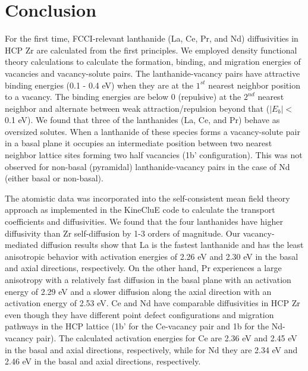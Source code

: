 \documentclass[preprint,12pt]{elsarticle}
\providecommand{\DIFadd}[1]{{\bf #1}} %
\providecommand{\DIFdel}[1]{} %
\providecommand{\DIFaddbegin}{\protect\color{blue}} %
\providecommand{\DIFaddend}{\protect\color{black}} %
\providecommand{\DIFdelbegin}{\protect\color{red}} %
\providecommand{\DIFdelend}{\protect\color{black}} %
\newcommand{\DIFscaledelfig}{0.5}
\newlength{\DIFdelgraphicswidth} %
\newlength{\DIFdelgraphicsheight} %
\newcommand{\DIFaddincludegraphics}[2][]{{\color{blue}\fbox{\DIFOincludegraphics[#1]{#2}}}} %
\newcommand{\DIFdelincludegraphics}[2][]{%
\sbox{\DIFdelgraphicsbox}{\DIFOincludegraphics[#1]{#2}}%
\settoboxwidth{\DIFdelgraphicswidth}{\DIFdelgraphicsbox} %
\settoboxtotalheight{\DIFdelgraphicsheight}{\DIFdelgraphicsbox} %
\scalebox{\DIFscaledelfig}{%
\parbox[b]{\DIFdelgraphicswidth}{\usebox{\DIFdelgraphicsbox}\\[-\baselineskip] \rule{\DIFdelgraphicswidth}{0em}}\llap{\resizebox{\DIFdelgraphicswidth}{\DIFdelgraphicsheight}{%
\setlength{\unitlength}{\DIFdelgraphicswidth}%
\begin{picture}(1,1)%
\thicklines\linethickness{2pt} %
{\color[rgb]{1,0,0}\put(0,0){\framebox(1,1){}}}%
{\color[rgb]{1,0,0}\put(0,0){\line( 1,1){1}}}%
{\color[rgb]{1,0,0}\put(0,1){\line(1,-1){1}}}%
\end{picture}%
}\hspace*{3pt}}} %
} %
\DeclareRobustCommand{\DIFaddbegin}{\DIFOaddbegin \let\includegraphics\DIFaddincludegraphics} %
\DeclareRobustCommand{\DIFaddend}{\DIFOaddend \let\includegraphics\DIFOincludegraphics} %
\DeclareRobustCommand{\DIFdelbegin}{\DIFOdelbegin \let\includegraphics\DIFdelincludegraphics} %
\DeclareRobustCommand{\DIFdelend}{\DIFOaddend \let\includegraphics\DIFOincludegraphics} %
\begin{document}
\section{Conclusion}
For the first time, FCCI-relevant lanthanide (La, Ce, Pr, and Nd) diffusivities in HCP Zr are calculated from the first principles. We employed density functional theory calculations to calculate the formation, binding, and migration energies of vacancies and vacancy-solute pairs. The lanthanide-vacancy pairs have attractive binding energies (0.1 - 0.4 eV) when they are at the $1^{st}$ nearest neighbor position to a vacancy. The binding energies are below 0 (repulsive) at the $2^{nd}$ nearest neighbor and alternate between weak attraction/repulsion beyond that ($|E_b| < $ 0.1 eV). We found that three of the lanthanides (La, Ce, and Pr) behave as oversized solutes. When a lanthanide of these species forms a vacancy-solute pair in a basal plane it occupies an intermediate position between two nearest neighbor lattice sites forming two half vacancies (1b' configuration). This was not observed for non-basal (pyramidal) lanthanide-vacancy pairs \DIFdelbegin \DIFdel{and was not observed }\DIFdelend \DIFaddbegin \DIFadd{or }\DIFaddend in the case of Nd (either basal or non-basal).

The atomistic data was incorporated into the self-consistent mean field theory approach as implemented in the KineCluE code \cite{schuler_kineclue_2020} to calculate the transport coefficients and diffusivities. We found that the four lanthanides have higher diffusivity than Zr self-diffusion by 1-3 orders of magnitude. Our vacancy-mediated diffusion results show that La is the fastest lanthanide and has the least anisotropic behavior with activation energies of 2.26 eV and 2.30 eV in the basal and axial directions, respectively. On the other hand, Pr experiences a large anisotropy with a relatively fast diffusion in the basal plane with an activation energy of 2.29 eV and a slower diffusion along the axial direction with an activation energy of 2.53 eV. Ce and Nd have comparable diffusivities in HCP Zr even though they have different point defect configurations and migration pathways in the HCP lattice (1b' for the Ce-vacancy pair and 1b for the Nd-vacancy pair). The calculated activation energies for Ce are 2.36 eV and 2.45 eV in the basal and axial directions, respectively, while for Nd \DIFdelbegin \DIFdel{, }\DIFdelend they are 2.34 eV and 2.46 eV in the basal and axial directions, respectively. \DIFdelbegin %
\end{document}
